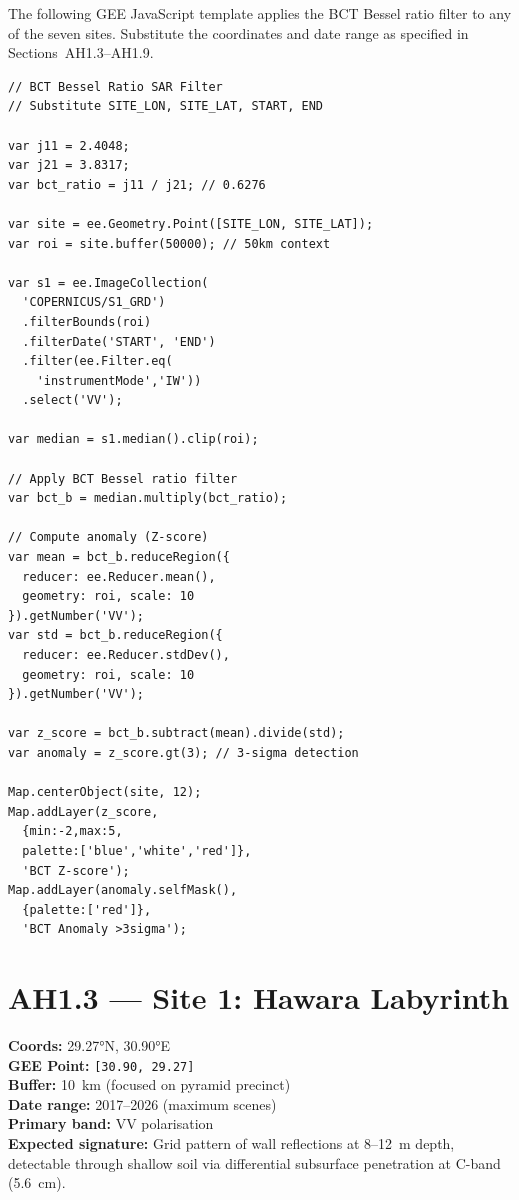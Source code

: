 \documentclass[12pt,twocolumn]{article}
\begin{document}
The following GEE JavaScript template applies the BCT
Bessel ratio filter to any of the seven sites. Substitute
the coordinates and date range as specified in
Sections~AH1.3--AH1.9.

{\scriptsize\begin{verbatim}
// BCT Bessel Ratio SAR Filter
// Substitute SITE_LON, SITE_LAT, START, END

var j11 = 2.4048;
var j21 = 3.8317;
var bct_ratio = j11 / j21; // 0.6276

var site = ee.Geometry.Point([SITE_LON, SITE_LAT]);
var roi = site.buffer(50000); // 50km context

var s1 = ee.ImageCollection(
  'COPERNICUS/S1_GRD')
  .filterBounds(roi)
  .filterDate('START', 'END')
  .filter(ee.Filter.eq(
    'instrumentMode','IW'))
  .select('VV');

var median = s1.median().clip(roi);

// Apply BCT Bessel ratio filter
var bct_b = median.multiply(bct_ratio);

// Compute anomaly (Z-score)
var mean = bct_b.reduceRegion({
  reducer: ee.Reducer.mean(),
  geometry: roi, scale: 10
}).getNumber('VV');
var std = bct_b.reduceRegion({
  reducer: ee.Reducer.stdDev(),
  geometry: roi, scale: 10
}).getNumber('VV');

var z_score = bct_b.subtract(mean).divide(std);
var anomaly = z_score.gt(3); // 3-sigma detection

Map.centerObject(site, 12);
Map.addLayer(z_score,
  {min:-2,max:5,
  palette:['blue','white','red']},
  'BCT Z-score');
Map.addLayer(anomaly.selfMask(),
  {palette:['red']},
  'BCT Anomaly >3sigma');
\end{verbatim}}

\section{AH1.3 --- Site 1: Hawara Labyrinth}

\textbf{Coords:} 29.27°N, 30.90°E\\
\textbf{GEE Point:} \verb|[30.90, 29.27]|\\
\textbf{Buffer:} 10~km (focused on pyramid precinct)\\
\textbf{Date range:} 2017--2026 (maximum scenes)\\
\textbf{Primary band:} VV polarisation\\
\textbf{Expected signature:} Grid pattern of wall reflections
at 8--12~m depth, detectable through shallow soil via
differential subsurface penetration at C-band (5.6~cm).
\end{document}
